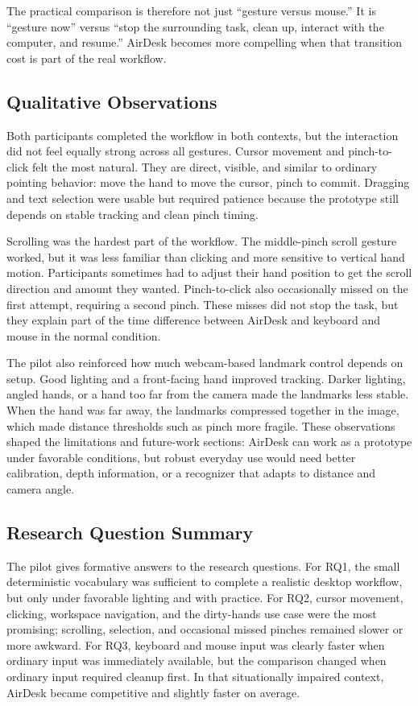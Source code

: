 \documentclass[manuscript]{acmart}
\begin{document}
The practical comparison is therefore not just ``gesture versus mouse.'' It is ``gesture now'' versus ``stop the surrounding task, clean up, interact with the computer, and resume.'' AirDesk becomes more compelling when that transition cost is part of the real workflow.

\subsection{Qualitative Observations}

Both participants completed the workflow in both contexts, but the interaction did not feel equally strong across all gestures. Cursor movement and pinch-to-click felt the most natural. They are direct, visible, and similar to ordinary pointing behavior: move the hand to move the cursor, pinch to commit. Dragging and text selection were usable but required patience because the prototype still depends on stable tracking and clean pinch timing.

Scrolling was the hardest part of the workflow. The middle-pinch scroll gesture worked, but it was less familiar than clicking and more sensitive to vertical hand motion. Participants sometimes had to adjust their hand position to get the scroll direction and amount they wanted. Pinch-to-click also occasionally missed on the first attempt, requiring a second pinch. These misses did not stop the task, but they explain part of the time difference between AirDesk and keyboard and mouse in the normal condition.

The pilot also reinforced how much webcam-based landmark control depends on setup. Good lighting and a front-facing hand improved tracking. Darker lighting, angled hands, or a hand too far from the camera made the landmarks less stable. When the hand was far away, the landmarks compressed together in the image, which made distance thresholds such as pinch more fragile. These observations shaped the limitations and future-work sections: AirDesk can work as a prototype under favorable conditions, but robust everyday use would need better calibration, depth information, or a recognizer that adapts to distance and camera angle.

\subsection{Research Question Summary}

The pilot gives formative answers to the research questions. For RQ1, the small deterministic vocabulary was sufficient to complete a realistic desktop workflow, but only under favorable lighting and with practice. For RQ2, cursor movement, clicking, workspace navigation, and the dirty-hands use case were the most promising; scrolling, selection, and occasional missed pinches remained slower or more awkward. For RQ3, keyboard and mouse input was clearly faster when ordinary input was immediately available, but the comparison changed when ordinary input required cleanup first. In that situationally impaired context, AirDesk became competitive and slightly faster on average.
\end{document}
